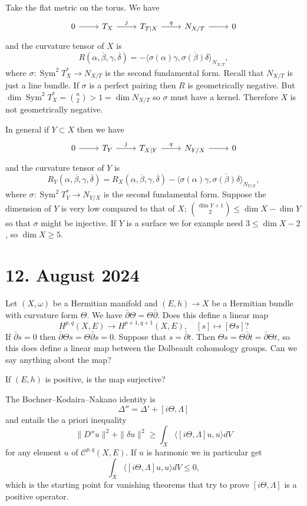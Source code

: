 \documentclass[11pt]{amsart}
\theoremstyle{definition}
\newcommand{\cc}[1]{\mathcal{#1}}
\def\ov#1{\overline{#1}}
\DeclareMathOperator{\Sym}{Sym}
\def\<{\langle}
\def\>{\rangle}
\begin{document}
Take the flat metric on the torus.
We have
\[
\begin{tikzcd}
0 \ar[r] &
T_X \ar[r,"j"] &
T_{T|X} \ar[r,"q"] &
N_{X/T} \ar[r] &
0
\end{tikzcd}
\]
and the curvature tensor of $X$ is
\[
R(\alpha, \ov\beta, \gamma, \ov\delta)
= - \< \sigma(\alpha) \gamma, \ov{\sigma(\beta) \delta} \>_{N_{X/T}},
\]
where $\sigma : \Sym^2 T_X^* \to N_{X/T}$ is the second fundamental form.
Recall that $N_{X/T}$ is just a line bundle.
If $\sigma$ is a perfect pairing then $R$ is geometrically negative.
But $\dim \Sym^2 T_X^* = \binom n2 > 1 = \dim N_{X/T}$ so $\sigma$ must have a kernel.
Therefore $X$ is not geometrically negative.

In general if $Y \subset X$ then we have
\[
\begin{tikzcd}
0 \ar[r] &
T_Y \ar[r,"j"] &
T_{X|Y} \ar[r,"q"] &
N_{Y/X} \ar[r] &
0
\end{tikzcd}
\]
and the curvature tensor of $Y$ is
\[
R_Y(\alpha, \ov\beta, \gamma, \ov\delta)
= R_X(\alpha, \ov\beta, \gamma, \ov\delta)
- \< \sigma(\alpha) \gamma, \ov{\sigma(\beta) \delta} \>_{N_{Y/X}},
\]
where $\sigma : \Sym^2 T_Y^* \to N_{Y/X}$ is the second fundamental form.
Suppose the dimension of $Y$ is very low compared to that of $X$; $\binom{\dim Y+1}{2} \leq \dim X - \dim Y$ so that $\sigma$ might be injective.
If $Y$ is a surface we for example need $3 \leq \dim X - 2$, so $\dim X \geq 5$.






\section{12. August 2024}

Let $(X, \omega)$ be a Hermitian manifold and $(E,h) \to X$ be a Hermitian
bundle with curvature form $\Theta$.
We have $\bar\partial \Theta = \Theta \bar\partial$.
Does this define a linear map
$$
H^{p,q}(X, E) \to H^{p+1,q+1}(X, E),
\quad
[s] \mapsto [\Theta s]
?
$$
If $\bar\partial s = 0$ then $\bar\partial \Theta s = \Theta \bar\partial s = 0$.
Suppose that $s = \bar\partial t$.
Then $\Theta s = \Theta \bar\partial t = \bar\partial \Theta t$, so this does
define a linear map between the Dolbeault cohomology groups.
Can we say anything about the map?

If $(E, h)$ is positive, is the map surjective?

The Bochner--Kodaira--Nakano identity is
$$
\Delta'' = \Delta' + [i\Theta, \Lambda]
$$
and entails the a priori inequality
$$
\|D''u\|^2 + \|\delta u\|^2 \geq \int_X \langle [i\Theta,\Lambda] u, u \rangle dV
$$
for any element $u$ of $\cc C^{p,q}(X,E)$.
If $u$ is harmonic we in particular get
$$
\int_X \langle [i\Theta,\Lambda] u, u \rangle dV \leq 0,
$$
which is the starting point for vanishing theorems that try to prove
$[i\Theta,\Lambda]$ is a positive operator.
\end{document}
